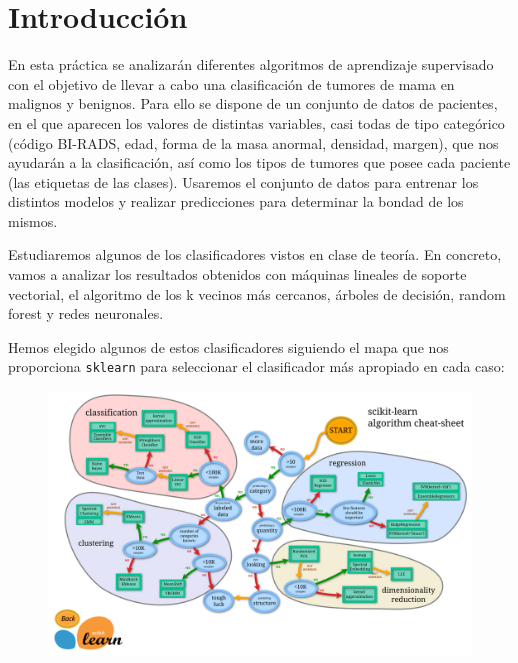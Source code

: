 \documentclass[a4paper,11pt]{article}
\begin{document}

%


\tableofcontents
\newpage


\section{Introducción}
En esta práctica se analizarán diferentes algoritmos de aprendizaje supervisado con el objetivo de llevar a cabo una clasificación de tumores de mama en malignos y benignos. Para ello se dispone de un conjunto de datos de pacientes, en el que aparecen los valores de distintas variables, casi todas de tipo categórico (código BI-RADS, edad, forma de la masa anormal, densidad, margen), que nos ayudarán a la clasificación, así como los tipos de tumores que posee cada paciente (las etiquetas de las clases). Usaremos el conjunto de datos para entrenar los distintos modelos y realizar predicciones para determinar la bondad de los mismos. 

Estudiaremos algunos de los clasificadores vistos en clase de teoría. En concreto, vamos a analizar los resultados obtenidos con máquinas lineales de soporte vectorial, el algoritmo de los k vecinos más cercanos, árboles de decisión, random forest y redes neuronales. 

Hemos elegido algunos de estos clasificadores siguiendo el mapa que nos proporciona \texttt{sklearn} para seleccionar el clasificador más apropiado en cada caso: 

\begin{figure}[H]
	\centering
	\includegraphics[width=1\linewidth]{img/map}
	\caption{}
	\label{fig:map}
\end{figure}
\end{document}
